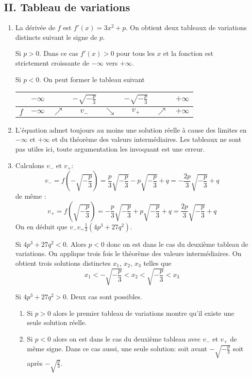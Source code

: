 \subsection*{II. Tableau de variations}
\begin{enumerate}
 \item La dérivée de $f$ est $f'(x) = 3x^2+p$. On obtient deux tableaux de variations distincts suivant le signe de $p$.

Si $p>0$. Dans ce cas $f'(x)>0$ pour tous les $x$ et la fonction est strictement croissante de $-\infty$ vers $+\infty$.

Si $p<0$. On peut former le tableau suivant
\begin{center}
\begin{tabular}{c|ccccccc}
    & $-\infty$ &            & $-\sqrt{-\frac{p}{3}}$ &           &$-\sqrt{-\frac{p}{3}}$ &            & $+\infty$\\ \hline
$f$ & $-\infty$ & $\nearrow$ &   $v_-$                &$\searrow$ &  $v_+$                & $\nearrow$ & $+\infty$
\end{tabular}
\end{center}

 \item L'équation admet toujours au moins une solution réelle à cause des limites en $-\infty$ et $+\infty$ et du théorème des valeurs intermédiaires. Les tableaux ne sont pas utiles ici, toute argumentation les invoquant est une erreur.

 \item Calculons $v_-$ et $v_+$:
\begin{displaymath}
v_- = f(-\sqrt{-\frac{p}{3}}) = \frac{p}{3}\sqrt{-\frac{p}{3}}-p\sqrt{-\frac{p}{3}} +q
=  -\frac{2p}{3}\sqrt{-\frac{p}{3}}+q
\end{displaymath}
de même :
\begin{displaymath}
v_+ = f(\sqrt{-\frac{p}{3}}) = -\frac{p}{3}\sqrt{-\frac{p}{3}}+p\sqrt{-\frac{p}{3}} +q
=  \frac{2p}{3}\sqrt{-\frac{p}{3}}+q
\end{displaymath}
On en déduit que $v_- v_= \frac{1}{3}(4p^3+27q^2)$.

Si $4p^3+27q^2<0$. Alors $p<0$ donc on est dans le cas du deuxième tableau de variations. On applique trois fois le théorème des valeurs intermédiaires. On obtient trois solutions distinctes $x_1$, $x_2$, $x_3$ telles que
\begin{displaymath}
 x_1 < -\sqrt{-\frac{p}{3}} < x_2 < \sqrt{-\frac{p}{3}} < x_3
\end{displaymath}

Si $4p^3+27q^2>0$. Deux cas sont possibles.
\begin{enumerate}
 \item Si $p>0$ alors le premier tableau de variations montre qu'il existe une seule solution réelle.
 \item Si $p<0$ alors on est dans le cas du deuxième tableau avec $v_-$ et $v_+$ de même signe. Dans ce cas aussi, une seule solution: soit avant $-\sqrt{-\frac{p}{3}}$ soit après $-\sqrt{\frac{p}{3}}$.
\end{enumerate}

\end{enumerate}
